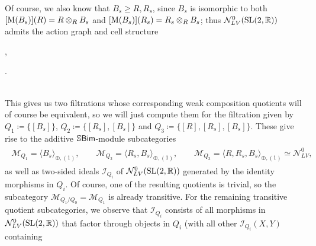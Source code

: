 \begin{example}
\noindent Of course, we also know that $B_{s} \geq R, R_{s}$, since $B_{s}$ is isomorphic to both $[\textup{M}(B_{s})](R) = R \otimes_R B_{s}$ and $[\textup{M}(B_{s})](R_{s}) = R_{s} \otimes_R B_{s}$; thus $\mathcal{N}_{LV}^0(\textup{SL}(2, \mathbb{R}))$ admits the action graph and cell structure\\[-2.1\linespacing]%
\begin{center}
\nhphantom{\quad\ \ },\qquad\qquad\qquad{}.
\end{center}
\noindent\\[-3.5\linespacing] This gives us two filtrations whose corresponding weak composition quotients will of course be equivalent, so we will just compute them for the filtration given by ${Q_1 \coloneqq \{[B_{s}]\}}$, ${Q_2 \coloneqq \{[R_{s}], [B_{s}]\}}$ and ${Q_3 \coloneqq \{[R], [R_{s}], [B_{s}]\}}$. These give rise to the additive $\mathbb{S}\textup{\textsf{Bim}}$-module subcategories
\begin{align*}
\begin{split}
\mathcal{M}_{Q_1} = \langle B_{s} \rangle_{\oplus,(1)},\qquad\mathcal{M}_{Q_2} = \langle R_{s}, B_{s}\rangle_{\oplus,(1)},\qquad\mathcal{M}_{Q_3} = \langle R, R_{s}, B_{s}\rangle_{\oplus,(1)} \simeq \mathcal{N}_{LV}^0,
\end{split}
\end{align*}
\noindent as well as two-sided ideals $\mathcal{I}_{Q_i}$ of $\mathcal{N}_{LV}^0(\textup{SL}(2, \mathbb{R}))$ generated by the identity morphisms in $Q_i$. Of course, one of the resulting quotients is trivial, so the subcategory $\mathcal{M}_{Q_1/Q_0} = \mathcal{M}_{Q_1}$ is already transitive. For the remaining transitive quotient subcategories, we observe that $\mathcal{I}_{Q_i}$ consists of all morphisms in $\mathcal{N}_{LV}^0(\textup{SL}(2, \mathbb{R}))$ that factor through objects in $Q_i$ (with all other $\mathcal{I}_{Q_i}(X, Y)$ containing %

\end{example}
